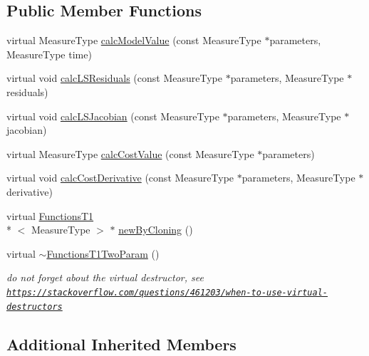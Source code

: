 \subsection*{Public Member Functions}
\begin{DoxyCompactItemize}
\item 
virtual Measure\-Type \hyperlink{class_ox_1_1_functions_t1_two_param_a7dd0a8b26764882b2eb5edf108985752}{calc\-Model\-Value} (const Measure\-Type $\ast$parameters, Measure\-Type time)
\item 
virtual void \hyperlink{class_ox_1_1_functions_t1_two_param_abb72f46fbcec51e305d86d760a1c0a2d}{calc\-L\-S\-Residuals} (const Measure\-Type $\ast$parameters, Measure\-Type $\ast$residuals)
\item 
virtual void \hyperlink{class_ox_1_1_functions_t1_two_param_a79a9c1d7765df93dcc58244927873618}{calc\-L\-S\-Jacobian} (const Measure\-Type $\ast$parameters, Measure\-Type $\ast$jacobian)
\item 
virtual Measure\-Type \hyperlink{class_ox_1_1_functions_t1_two_param_a23e5a6d7aebe999c631f17a91b5269fe}{calc\-Cost\-Value} (const Measure\-Type $\ast$parameters)
\item 
virtual void \hyperlink{class_ox_1_1_functions_t1_two_param_ae530bc72b9f8a51ed9eef8ae55758e78}{calc\-Cost\-Derivative} (const Measure\-Type $\ast$parameters, Measure\-Type $\ast$derivative)
\item 
virtual \hyperlink{class_ox_1_1_functions_t1}{Functions\-T1}\\*
$<$ Measure\-Type $>$ $\ast$ \hyperlink{class_ox_1_1_functions_t1_two_param_a023a84c85a09fd184e50980778aaf0fb}{new\-By\-Cloning} ()
\item 
\hypertarget{class_ox_1_1_functions_t1_two_param_a0162a8d088bc8e679531b9f726a55d8b}{virtual \hyperlink{class_ox_1_1_functions_t1_two_param_a0162a8d088bc8e679531b9f726a55d8b}{$\sim$\-Functions\-T1\-Two\-Param} ()}\label{class_ox_1_1_functions_t1_two_param_a0162a8d088bc8e679531b9f726a55d8b}

\begin{DoxyCompactList}\small\item\em do not forget about the virtual destructor, see \href{https://stackoverflow.com/questions/461203/when-to-use-virtual-destructors}{\tt https\-://stackoverflow.\-com/questions/461203/when-\/to-\/use-\/virtual-\/destructors} \end{DoxyCompactList}\end{DoxyCompactItemize}
\subsection*{Additional Inherited Members}


